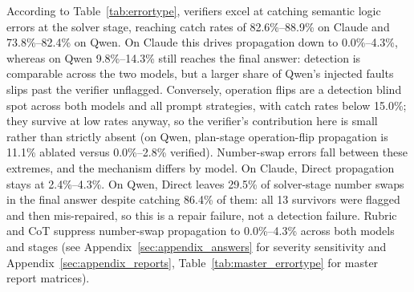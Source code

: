 \documentclass[11pt]{article}
\begin{document}
According to Table~\ref{tab:errortype}, verifiers excel at catching semantic logic errors at the solver stage, reaching catch rates of 82.6\%--88.9\% on Claude and 73.8\%--82.4\% on Qwen. On Claude this drives propagation down to 0.0\%--4.3\%, whereas on Qwen 9.8\%--14.3\% still reaches the final answer: detection is comparable across the two models, but a larger share of Qwen's injected faults slips past the verifier unflagged. Conversely, operation flips are a detection blind spot across both models and all prompt strategies, with catch rates below 15.0\%; they survive at low rates anyway, so the verifier's contribution here is small rather than strictly absent (on Qwen, plan-stage operation-flip propagation is 11.1\% ablated versus 0.0\%--2.8\% verified). Number-swap errors fall between these extremes, and the mechanism differs by model. On Claude, Direct propagation stays at 2.4\%--4.3\%. On Qwen, Direct leaves 29.5\% of solver-stage number swaps in the final answer despite catching 86.4\% of them: all 13 survivors were flagged and then mis-repaired, so this is a repair failure, not a detection failure. Rubric and CoT suppress number-swap propagation to 0.0\%--4.3\% across both models and stages (see Appendix~\ref{sec:appendix_answers} for severity sensitivity and Appendix~\ref{sec:appendix_reports}, Table~\ref{tab:master_errortype} for master report matrices).
\end{document}

